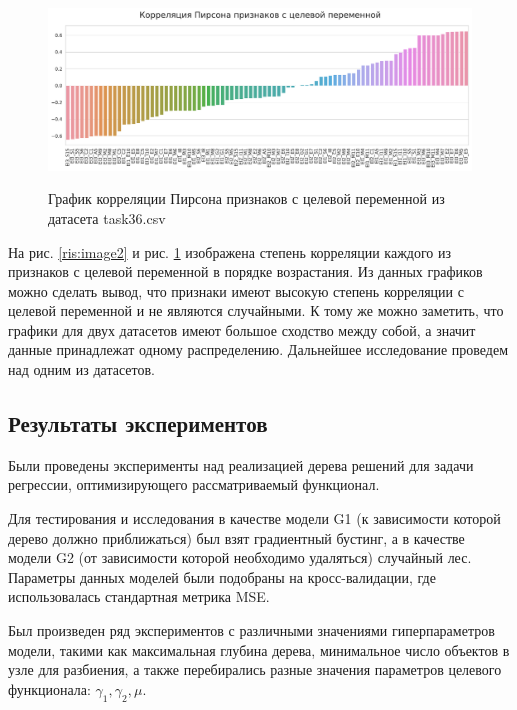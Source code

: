 \documentclass{article}
\begin{document}
\begin{figure}[h]
	\centering
	
	\begin{minipage}[h]{\linewidth}
		{\includegraphics[width=1.0\linewidth]{../figures/corr_task36.pdf}}	
	\end{minipage}
	
	
	\caption{График корреляции Пирсона признаков с целевой переменной из датасета task36.csv }
	\label{ris:image3}
\end{figure}

На рис. \ref{ris:image2} и рис. \ref{ris:image3} изображена степень корреляции каждого из признаков с целевой переменной в порядке возрастания. Из данных графиков можно сделать вывод, что признаки имеют высокую степень корреляции с целевой переменной и не являются случайными. К тому же можно заметить, что графики для двух датасетов имеют большое сходство между собой, а значит данные принадлежат одному распределению. Дальнейшее исследование проведем над одним из датасетов.


\vspace{1.3cm}

\subsection{Результаты экспериментов}

Были проведены эксперименты над реализацией дерева решений для задачи регрессии, оптимизирующего рассматриваемый функционал.

Для тестирования и исследования в качестве модели G1 (к зависимости которой дерево должно приближаться) был взят градиентный бустинг, а в качестве модели G2 (от зависимости которой необходимо удаляться) случайный лес. Параметры данных моделей были подобраны на кросс-валидации, где использовалась стандартная метрика MSE.

Был произведен ряд экспериментов с различными значениями гиперпараметров модели, такими как максимальная глубина дерева, минимальное число объектов в узле для разбиения, а также перебирались разные значения параметров целевого функционала: $\gamma_1, \gamma_2, \mu$.
\end{document}

